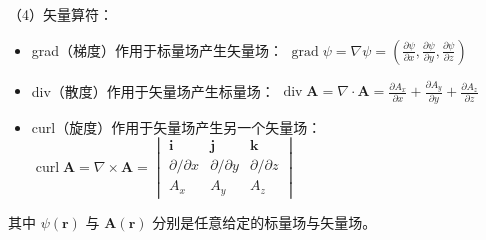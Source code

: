 （4）矢量算符：
\begin{itemize}[itemsep=0.2em]
\item grad（梯度）作用于标量场产生矢量场：
$\operatorname{grad}\psi=\nabla\psi=\left(\frac{\partial\psi}{\partial x},\frac{\partial\psi}{\partial y},\frac{\partial\psi}{\partial z}\right)$
\item div（散度）作用于矢量场产生标量场：
$\operatorname{div}\mathbf{A}=\nabla\cdot\mathbf{A}=\frac{\partial A_x}{\partial x}+\frac{\partial A_y}{\partial y}+\frac{\partial A_z}{\partial z}$
\item curl（旋度）作用于矢量场产生另一个矢量场：
$\operatorname{curl}\mathbf{A}=\nabla\times\mathbf{A}=\begin{vmatrix}\mathbf{i} & \mathbf{j} & \mathbf{k}\\ \partial/\partial x & \partial/\partial y & \partial/\partial z\\ A_x & A_y & A_z\end{vmatrix}$
\end{itemize}
其中 $\psi(\mathbf{r})$ 与 $\mathbf{A}(\mathbf{r})$ 分别是任意给定的标量场与矢量场。


